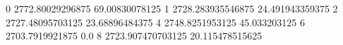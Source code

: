 0 2772.80029296875 69.00830078125
1 2728.283935546875 24.491943359375
2 2727.48095703125 23.68896484375
4 2748.8251953125 45.033203125
6 2703.7919921875 0.0
8 2723.907470703125 20.115478515625
